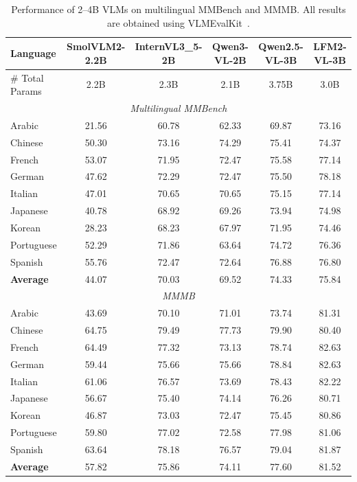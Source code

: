\documentclass{article}
\begin{document}
\begin{table}[h!]
\centering
\scriptsize
\begin{tabular}{lccccc}
\toprule
\textbf{Language} & \textbf{SmolVLM2-2.2B} & \textbf{InternVL3\_5-2B} & \textbf{Qwen3-VL-2B} & \textbf{Qwen2.5-VL-3B} & \textbf{LFM2-VL-3B} \\
\midrule
\# Total Params & 2.2B & 2.3B & 2.1B & 3.75B & 3.0B  \\
\midrule
\multicolumn{6}{c}{\textit{Multilingual MMBench}} \\
\midrule
Arabic & 21.56 & 60.78 & 62.33 & 69.87 & 73.16 \\
Chinese & 50.30 & 73.16 & 74.29 & 75.41 & 74.37 \\
French & 53.07 & 71.95 & 72.47 & 75.58 & 77.14 \\
German & 47.62 & 72.29 & 72.47 & 75.50 & 78.18 \\
Italian & 47.01 & 70.65 & 70.65 & 75.15 & 77.14 \\
Japanese & 40.78 & 68.92 & 69.26 & 73.94 & 74.98 \\
Korean & 28.23 & 68.23 & 67.97 & 71.95 & 74.46 \\
Portuguese & 52.29 & 71.86 & 63.64 & 74.72 & 76.36 \\
Spanish & 55.76 & 72.47 & 72.64 & 76.88 & 76.80 \\
\midrule
\textbf{Average} & 44.07 & 70.03 & 69.52 & 74.33 & 75.84 \\
\midrule
\multicolumn{6}{c}{\textit{MMMB}} \\
\midrule
Arabic & 43.69 & 70.10 & 71.01 & 73.74 & 81.31 \\
Chinese & 64.75 & 79.49 & 77.73 & 79.90 & 80.40 \\
French & 64.49 & 77.32 & 73.13 & 78.74 & 82.63 \\
German & 59.44 & 75.66 & 75.66 & 78.84 & 82.63 \\
Italian & 61.06 & 76.57 & 73.69 & 78.43 & 82.22 \\
Japanese & 56.67 & 75.40 & 74.14 & 76.26 & 80.71 \\
Korean & 46.87 & 73.03 & 72.47 & 75.45 & 80.86 \\
Portuguese & 59.80 & 77.02 & 72.58 & 77.98 & 81.06 \\
Spanish & 63.64 & 78.18 & 76.57 & 79.04 & 81.87 \\
\midrule
\textbf{Average} & 57.82 & 75.86 & 74.11 & 77.60 & 81.52 \\
\bottomrule
\end{tabular}
\caption{Performance of 2--4B VLMs on multilingual MMBench and MMMB. All results are obtained using VLMEvalKit~\citep{duan2025vlmevalkitopensourcetoolkitevaluating}.}
\label{tab:vl-multilingual}
\end{table}
\end{document}
